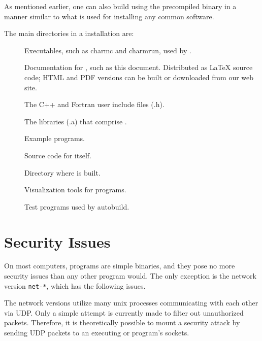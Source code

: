 As mentioned earlier, one can also build \charmpp{} using the precompiled binary
in a manner similar to what is used for installing any common software.


The main directories in a \charmpp{} installation are:

\begin{description}
\item[]
Executables, such as charmc and charmrun,
used by \charmpp{}.

\item[]
Documentation for \charmpp{}, such as this
document.  Distributed as LaTeX source code; HTML and PDF versions
can be built or downloaded from our web site.

\item[]
The \charmpp{} C++ and Fortran user include files (.h).

\item[]
The libraries (.a) that comprise \charmpp{}.

\item[]
Example \charmpp{} programs.

\item[]
Source code for \charmpp{} itself.

\item[]
Directory where \charmpp{} is built.

\item[]
Visualization tools for \charmpp{} programs.

\item[]
Test \charmpp{} programs used by autobuild.

\end{description}

\section{Security Issues}

On most computers, \charmpp{} programs are simple binaries, and they pose
no more security issues than any other program would.  The only exception
is the network version {\tt net-*}, which has the following issues. 

The network versions utilize many unix processes communicating with
each other via UDP.  Only a simple attempt is currently made to filter out
unauthorized packets.  Therefore, it is theoretically possible to
mount a security attack by sending UDP packets to an executing
\converse{} or \charmpp{} program's sockets.

